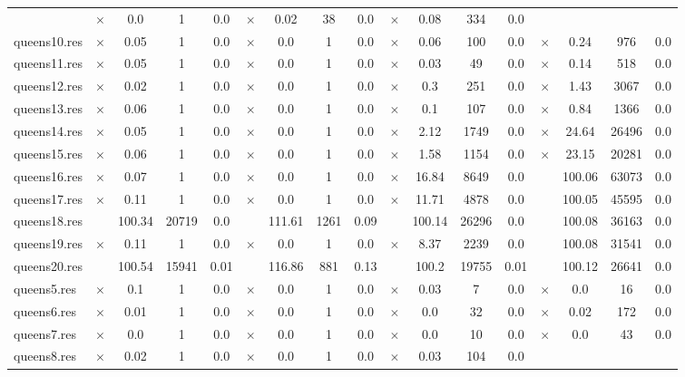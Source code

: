 \documentclass[main.tex]{subfiles}
\begin{document}
\begin{landscape}
\begin{center}
\begin{tabular}{lcccccccccccccccc}
 & $\times$ & 0.0 & 1 & 0.0
 & $\times$ & 0.02 & 38 & 0.0
 & $\times$ & 0.08 & 334 & 0.0
\\
queens10.res & $\times$ & 0.05 & 1 & 0.0
 & $\times$ & 0.0 & 1 & 0.0
 & $\times$ & 0.06 & 100 & 0.0
 & $\times$ & 0.24 & 976 & 0.0
\\
queens11.res & $\times$ & 0.05 & 1 & 0.0
 & $\times$ & 0.0 & 1 & 0.0
 & $\times$ & 0.03 & 49 & 0.0
 & $\times$ & 0.14 & 518 & 0.0
\\
queens12.res & $\times$ & 0.02 & 1 & 0.0
 & $\times$ & 0.0 & 1 & 0.0
 & $\times$ & 0.3 & 251 & 0.0
 & $\times$ & 1.43 & 3067 & 0.0
\\
queens13.res & $\times$ & 0.06 & 1 & 0.0
 & $\times$ & 0.0 & 1 & 0.0
 & $\times$ & 0.1 & 107 & 0.0
 & $\times$ & 0.84 & 1366 & 0.0
\\
queens14.res & $\times$ & 0.05 & 1 & 0.0
 & $\times$ & 0.0 & 1 & 0.0
 & $\times$ & 2.12 & 1749 & 0.0
 & $\times$ & 24.64 & 26496 & 0.0
\\
queens15.res & $\times$ & 0.06 & 1 & 0.0
 & $\times$ & 0.0 & 1 & 0.0
 & $\times$ & 1.58 & 1154 & 0.0
 & $\times$ & 23.15 & 20281 & 0.0
\\
queens16.res & $\times$ & 0.07 & 1 & 0.0
 & $\times$ & 0.0 & 1 & 0.0
 & $\times$ & 16.84 & 8649 & 0.0
 &  & 100.06 & 63073 & 0.0
\\
queens17.res & $\times$ & 0.11 & 1 & 0.0
 & $\times$ & 0.0 & 1 & 0.0
 & $\times$ & 11.71 & 4878 & 0.0
 &  & 100.05 & 45595 & 0.0
\\
queens18.res &  & 100.34 & 20719 & 0.0
 &  & 111.61 & 1261 & 0.09
 &  & 100.14 & 26296 & 0.0
 &  & 100.08 & 36163 & 0.0
\\
queens19.res & $\times$ & 0.11 & 1 & 0.0
 & $\times$ & 0.0 & 1 & 0.0
 & $\times$ & 8.37 & 2239 & 0.0
 &  & 100.08 & 31541 & 0.0
\\
queens20.res &  & 100.54 & 15941 & 0.01
 &  & 116.86 & 881 & 0.13
 &  & 100.2 & 19755 & 0.01
 &  & 100.12 & 26641 & 0.0
\\
queens5.res & $\times$ & 0.1 & 1 & 0.0
 & $\times$ & 0.0 & 1 & 0.0
 & $\times$ & 0.03 & 7 & 0.0
 & $\times$ & 0.0 & 16 & 0.0
\\
queens6.res & $\times$ & 0.01 & 1 & 0.0
 & $\times$ & 0.0 & 1 & 0.0
 & $\times$ & 0.0 & 32 & 0.0
 & $\times$ & 0.02 & 172 & 0.0
\\
queens7.res & $\times$ & 0.0 & 1 & 0.0
 & $\times$ & 0.0 & 1 & 0.0
 & $\times$ & 0.0 & 10 & 0.0
 & $\times$ & 0.0 & 43 & 0.0
\\
queens8.res & $\times$ & 0.02 & 1 & 0.0
 & $\times$ & 0.0 & 1 & 0.0
 & $\times$ & 0.03 & 104 & 0.0

\end{tabular}
\end{center}
\end{landscape}
\end{document}
